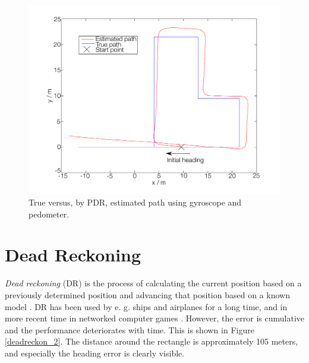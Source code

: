 \documentclass{LTHthesis}
\begin{document}
%
%
\begin{figure}[!hbt]

\includegraphics[width=1\textwidth ]{images/kinematic/deadreckon_1}
\caption{True versus, by PDR, estimated path using gyroscope and pedometer.}\label{deadreckon_1}
\end{figure}
%
\section{Dead Reckoning}

\emph{Dead reckoning} (DR) is the process of calculating the current position based on a previously determined position and advancing that position based on a known model \cite{ped_dead}. DR has been used by e. g. ships and airplanes for a long time, and in more recent time in networked computer games \cite{network_game}. However, the error is cumulative and the performance deteriorates with time. This is shown in Figure \ref{deadreckon_2}. The distance around the rectangle is approximately 105 meters, and especially the heading error is clearly visible. 
\end{document}
